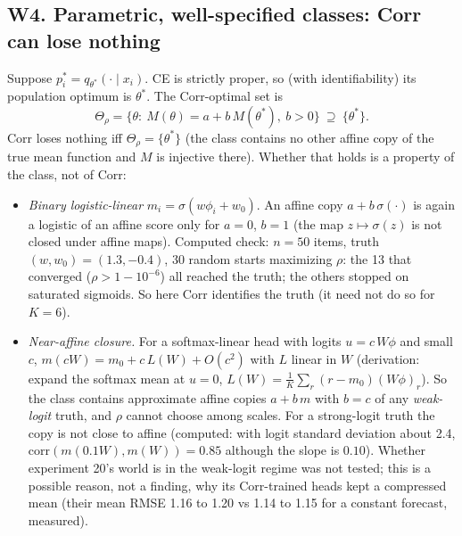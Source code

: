 \documentclass[11pt]{article}
\begin{document}
\subsection*{W4. Parametric, well-specified classes: Corr can lose nothing}
Suppose $p^\ast_i=q_{\theta^\ast}(\cdot\mid x_i)$. CE is strictly proper, so (with identifiability) its population optimum is $\theta^\ast$. The Corr-optimal set is
\[
\Theta_\rho=\{\theta:\ M(\theta)=a+b\,M(\theta^\ast),\ b>0\}\ \supseteq\ \{\theta^\ast\}.
\]
Corr loses nothing iff $\Theta_\rho=\{\theta^\ast\}$ (the class contains no other affine copy of the true mean function and $M$ is injective there). Whether that holds is a property of the class, not of Corr:
\begin{itemize}
\item \emph{Binary logistic-linear} $m_i=\sigma(w\phi_i+w_0)$. An affine copy $a+b\,\sigma(\cdot)$ is again a logistic of an affine score only for $a=0$, $b=1$ (the map $z\mapsto\sigma(z)$ is not closed under affine maps). Computed check: $n=50$ items, truth $(w,w_0)=(1.3,-0.4)$, 30 random starts maximizing $\rho$: the 13 that converged ($\rho>1-10^{-6}$) all reached the truth; the others stopped on saturated sigmoids. So here Corr identifies the truth (it need not do so for $K=6$).
\item \emph{Near-affine closure.} For a softmax-linear head with logits $u=c\,W\phi$ and small $c$, $m(cW)=m_0+c\,L(W)+O(c^2)$ with $L$ linear in $W$ (derivation: expand the softmax mean at $u=0$, $L(W)=\frac1K\sum_r(r-m_0)(W\phi)_r$). So the class contains approximate affine copies $a+b\,m$ with $b=c$ of any \emph{weak-logit} truth, and $\rho$ cannot choose among scales. For a strong-logit truth the copy is not close to affine (computed: with logit standard deviation about 2.4, $\mathrm{corr}(m(0.1W),m(W))=0.85$ although the slope is $0.10$). Whether experiment 20's world is in the weak-logit regime was not tested; this is a possible reason, not a finding, why its Corr-trained heads kept a compressed mean (their mean RMSE 1.16 to 1.20 vs 1.14 to 1.15 for a constant forecast, measured).
\end{itemize}
\end{document}
